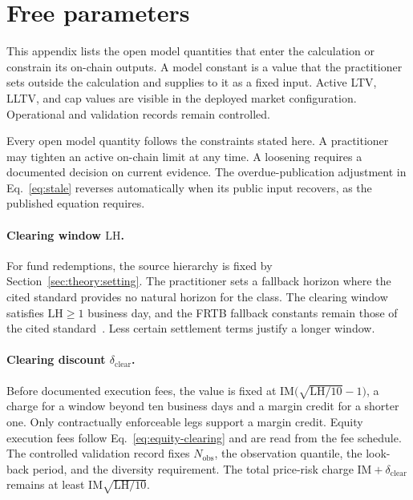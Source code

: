\section{Free parameters}\label{sec:free-parameters}

This appendix lists the open model quantities that enter the calculation or constrain its on-chain outputs. A model constant is a value that the practitioner sets outside the calculation and supplies to it as a fixed input. Active LTV, LLTV, and cap values are visible in the deployed market configuration. Operational and validation records remain controlled.

Every open model quantity follows the constraints stated here. A practitioner may tighten an active on-chain limit at any time. A loosening requires a documented decision on current evidence. The overdue-publication adjustment in Eq.~\eqref{eq:stale} reverses automatically when its public input recovers, as the published equation requires.

\paragraph{Clearing window $\mathrm{LH}$.}
For fund redemptions, the source hierarchy is fixed by Section~\ref{sec:theory:setting}. The practitioner sets a fallback horizon where the cited standard provides no natural horizon for the class. The clearing window satisfies $\mathrm{LH}\ge 1$ business day, and the FRTB fallback constants remain those of the cited standard~\cite{bcbs_frtb_d457}. Less certain settlement terms justify a longer window.

\paragraph{Clearing discount $\delta_{\mathrm{clear}}$.}
Before documented execution fees, the value is fixed at $\mathrm{IM}\bigl(\sqrt{\mathrm{LH}/10}-1\bigr)$, a charge for a window beyond ten business days and a margin credit for a shorter one. Only contractually enforceable legs support a margin credit. Equity execution fees follow Eq.~\eqref{eq:equity-clearing} and are read from the fee schedule. The controlled validation record fixes $N_{\mathrm{obs}}$, the observation quantile, the look-back period, and the diversity requirement. The total price-risk charge $\mathrm{IM}+\delta_{\mathrm{clear}}$ remains at least $\mathrm{IM}\sqrt{\mathrm{LH}/10}$.

